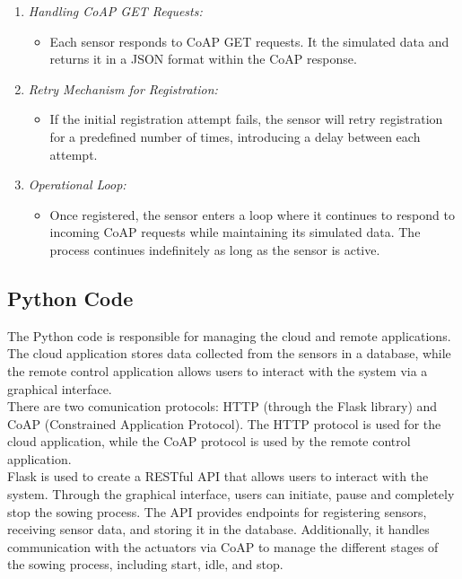 \begin{enumerate}
    \item \textit{Handling CoAP GET Requests:}
    \begin{itemize}
        \item Each sensor responds to CoAP GET requests. It the simulated data and returns it in a JSON format within the CoAP response.
    \end{itemize}

    \item \textit{Retry Mechanism for Registration:}
    \begin{itemize}
        \item If the initial registration attempt fails, the sensor will retry registration for a predefined number of times, introducing a delay between each attempt.
    \end{itemize}

    \item \textit{Operational Loop:}
    \begin{itemize}
        \item Once registered, the sensor enters a loop where it continues to respond to incoming CoAP requests while maintaining its simulated data. The process continues indefinitely as long as the sensor is active.
    \end{itemize}
    
\end{enumerate}


\newpage

\subsection{Python Code}


The Python code is responsible for managing the cloud and remote applications. The cloud application stores data collected from the sensors in a database, while the remote control application allows users to interact with the system via a graphical interface.\\

There are two comunication protocols: HTTP (through the Flask library) and CoAP (Constrained Application Protocol). The HTTP protocol is used for the cloud application, while the CoAP protocol is used by the remote control application.\\
Flask is used to create a RESTful API that allows users to interact with the system. Through the graphical interface, users can initiate, pause and completely stop the sowing process. The API provides endpoints for registering sensors, receiving sensor data, and storing it in the database. Additionally, it handles communication with the actuators via CoAP to manage the different stages of the sowing process, including start, idle, and stop.\\

